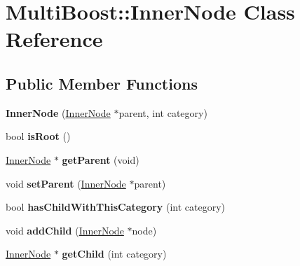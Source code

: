 \hypertarget{classMultiBoost_1_1InnerNode}{\section{Multi\-Boost\-:\-:Inner\-Node Class Reference}
\label{classMultiBoost_1_1InnerNode}
}
\subsection*{Public Member Functions}
\begin{DoxyCompactItemize}
\item 
\hypertarget{classMultiBoost_1_1InnerNode_a0ca6ff8d9772b599b47a3901fc9d7c8c}{{\bfseries Inner\-Node} (\hyperlink{classMultiBoost_1_1InnerNode}{Inner\-Node} $\ast$parent, int category)}\label{classMultiBoost_1_1InnerNode_a0ca6ff8d9772b599b47a3901fc9d7c8c}

\item 
\hypertarget{classMultiBoost_1_1InnerNode_acd6e9cd732b833ea7c2372a9a67a9814}{bool {\bfseries is\-Root} ()}\label{classMultiBoost_1_1InnerNode_acd6e9cd732b833ea7c2372a9a67a9814}

\item 
\hypertarget{classMultiBoost_1_1InnerNode_a86f4a50b23ecb4725fdc54de1e07fab9}{\hyperlink{classMultiBoost_1_1InnerNode}{Inner\-Node} $\ast$ {\bfseries get\-Parent} (void)}\label{classMultiBoost_1_1InnerNode_a86f4a50b23ecb4725fdc54de1e07fab9}

\item 
\hypertarget{classMultiBoost_1_1InnerNode_ad0312d3c5aab67acaf4c27dfc732e865}{void {\bfseries set\-Parent} (\hyperlink{classMultiBoost_1_1InnerNode}{Inner\-Node} $\ast$parent)}\label{classMultiBoost_1_1InnerNode_ad0312d3c5aab67acaf4c27dfc732e865}

\item 
\hypertarget{classMultiBoost_1_1InnerNode_a3689b26ffaaee5a6d4f01ab67a707448}{bool {\bfseries has\-Child\-With\-This\-Category} (int category)}\label{classMultiBoost_1_1InnerNode_a3689b26ffaaee5a6d4f01ab67a707448}

\item 
\hypertarget{classMultiBoost_1_1InnerNode_a5967efc12ff4c4fe15a21e6bae1105de}{void {\bfseries add\-Child} (\hyperlink{classMultiBoost_1_1InnerNode}{Inner\-Node} $\ast$node)}\label{classMultiBoost_1_1InnerNode_a5967efc12ff4c4fe15a21e6bae1105de}

\item 
\hypertarget{classMultiBoost_1_1InnerNode_acae95a3ccd58b27f4ce4289fe8844439}{\hyperlink{classMultiBoost_1_1InnerNode}{Inner\-Node} $\ast$ {\bfseries get\-Child} (int category)}\label{classMultiBoost_1_1InnerNode_acae95a3ccd58b27f4ce4289fe8844439}


\end{DoxyCompactItemize}

